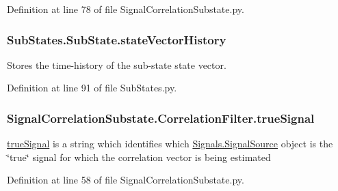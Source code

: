 Definition at line 78 of file Signal\+Correlation\+Substate.\+py.

\subsubsection[{\texorpdfstring{state\+Vector\+History}{stateVectorHistory}}]{\setlength{\rightskip}{0pt plus 5cm}Sub\+States.\+Sub\+State.\+state\+Vector\+History\hspace{0.3cm}{\ttfamily [inherited]}}\hypertarget{classSubStates_1_1SubState_a24bf2de56fc3037d91cba43d28f3bf60}{}\label{classSubStates_1_1SubState_a24bf2de56fc3037d91cba43d28f3bf60}


Stores the time-\/history of the sub-\/state state vector. 



Definition at line 91 of file Sub\+States.\+py.

\subsubsection[{\texorpdfstring{true\+Signal}{trueSignal}}]{\setlength{\rightskip}{0pt plus 5cm}Signal\+Correlation\+Substate.\+Correlation\+Filter.\+true\+Signal}\hypertarget{classSignalCorrelationSubstate_1_1CorrelationFilter_a67ff75effd8a8a7e34f0f3e8c56ef491}{}\label{classSignalCorrelationSubstate_1_1CorrelationFilter_a67ff75effd8a8a7e34f0f3e8c56ef491}


\hyperlink{classSignalCorrelationSubstate_1_1CorrelationFilter_a67ff75effd8a8a7e34f0f3e8c56ef491}{true\+Signal} is a string which identifies which \hyperlink{classSignals_1_1SignalSource}{Signals.\+Signal\+Source} object is the \char`\"{}true\char`\"{} signal for which the correlation vector is being estimated 



Definition at line 58 of file Signal\+Correlation\+Substate.\+py.

